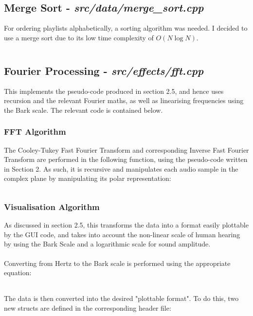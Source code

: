 \pagebreak
\subsection{Merge Sort - \textit{src/data/merge\_sort.cpp}}
For ordering playlists alphabetically, a sorting  algorithm was needed. I decided to use a merge sort due to its low time complexity of \(O(N \log{N})\).
\inputminted[linenos]{c++}{../src/data/merge_sort.cpp}

\pagebreak
\subsection{Fourier Processing - \textit{src/effects/fft.cpp}}
This implements the pseudo-code produced in section 2.5, and hence uses recursion and the relevant Fourier maths, as well as linearising frequencies using the Bark scale. The relevant code is contained below.

\subsubsection{FFT Algorithm}
The Cooley-Tukey Fast Fourier Transform and corresponding Inverse Fast Fourier Transform are performed in the following function, using the pseudo-code written in Section 2. As such, it is recursive and manipulates each audio sample in the complex plane by manipulating its polar representation:
\inputminted[linenos, firstline=49, lastline=79]{c++}{../src/effects/fft.cpp}

\pagebreak
\subsubsection{Visualisation Algorithm}
As discussed in section 2.5, this transforms the data into a format easily plottable by the GUI code, and takes into account the non-linear scale of human hearing by using the Bark Scale and  a logarithmic scale for sound amplitude.

\paragraph{}
Converting from Hertz to the Bark scale is performed using the appropriate equation:
\inputminted[linenos, firstline=150, lastline=156]{c++}{../src/effects/fft.cpp}

\paragraph{}
The data is then converted into the desired "plottable format". To do this, two new structs are defined in the corresponding header file:
\inputminted[linenos, firstline=16, lastline=29]{c++}{../include/effects/fft.h}

